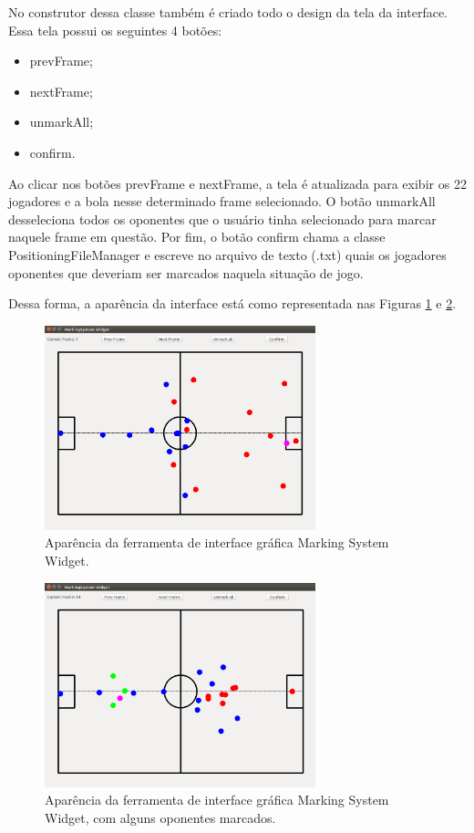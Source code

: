 \documentclass[a4paper,12pt]{article}
\begin{document}
No construtor dessa classe também é criado todo o design da tela da interface. Essa tela possui os seguintes 4 botões:
\begin{itemize}
\item prevFrame;
\item nextFrame;
\item unmarkAll;
\item confirm.
\end{itemize}

Ao clicar nos botões prevFrame e nextFrame, a tela é atualizada para exibir os 22 jogadores e a bola nesse determinado frame selecionado. O botão unmarkAll desseleciona todos os oponentes que o usuário tinha selecionado para marcar naquele frame em questão. Por fim, o botão confirm chama a classe PositioningFileManager e escreve no arquivo de texto (.txt) quais os jogadores oponentes que deveriam ser marcados naquela situação de jogo.

Dessa forma, a aparência da interface está como representada nas Figuras \ref{fig:ms-widget} e \ref{fig:ms-widget2}.

\begin{figure}[H]
	\centering
	\includegraphics[width=0.7\textwidth]{figures/frame1.png}
   \caption{Aparência da ferramenta de interface gráfica Marking System Widget.} \label{fig:ms-widget}
\end{figure}

\begin{figure}[H]
	\centering
	\includegraphics[width=0.7\textwidth]{figures/frame14.png}
   \caption{Aparência da ferramenta de interface gráfica Marking System Widget, com alguns oponentes marcados.} \label{fig:ms-widget2}
\end{figure}
\end{document}
